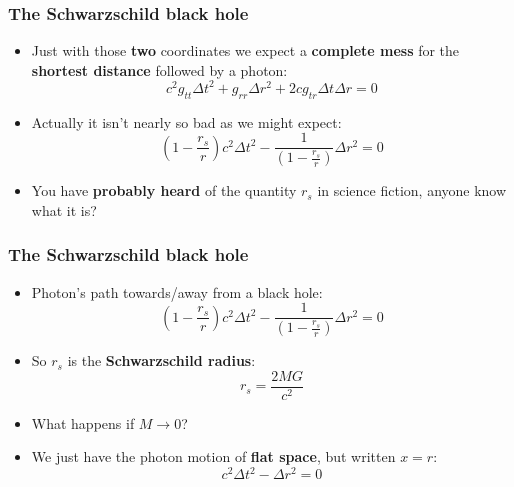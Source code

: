 \documentclass{beamer}
\begin{document}
\begin{frame}
  \frametitle{The Schwarzschild black hole}
  \begin{itemize}
    \item<1-> Just with those \textbf{two} coordinates we expect a \textbf{complete mess} for the \textbf{shortest distance} followed by a photon:
      \begin{equation*}
	c^2g_{tt}\Delta t^2+g_{rr}\Delta r^2+2cg_{tr}\Delta t\Delta r=0
      \end{equation*}
    \item<2-> Actually it isn't nearly so bad as we might expect:
      \begin{equation*}
	\left( 1-\frac{r_s}{r} \right)c^2\Delta t^2-\frac{1}{\left( 1-\frac{r_s}{r} \right)}\Delta r^2=0
      \end{equation*}
    \item<3-> You have \textbf{probably heard} of the quantity $r_s$ in science fiction, anyone know what it is?
  \end{itemize}
\end{frame}

\begin{frame}
  \frametitle{The Schwarzschild black hole}
  \begin{itemize}
    \item<1-> Photon's path towards/away from a black hole:
      \begin{equation*}
	\left( 1-\frac{r_s}{r} \right)c^2\Delta t^2-\frac{1}{\left( 1-\frac{r_s}{r} \right)}\Delta r^2=0
      \end{equation*}
    \item<2-> So $r_s$ is the \textbf{Schwarzschild radius}:
      \begin{equation*}
	r_s=\frac{2MG}{c^2}
      \end{equation*}
    \item<3-> What happens if $M\to 0$?
    \item<4-> We just have the photon motion of \textbf{flat space}, but written $x=r$:
      \begin{equation*}
	c^2\Delta t^2-\Delta r^2=0
      \end{equation*}
  \end{itemize}
\end{frame}
\end{document}
